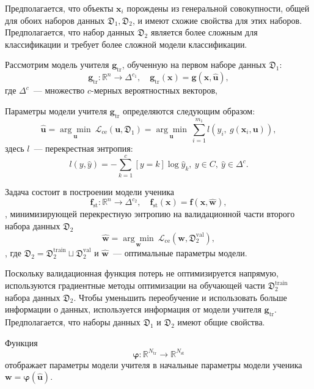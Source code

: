 Предполагается, что объекты $\mathbf{x}_i$ порождены из генеральной совокупности, общей для обоих наборов данных $\mathfrak{D}_1, \mathfrak{D}_2$, и имеют схожие свойства для этих наборов.
Предполагается, что набор данных $\mathfrak{D}_2$ является более сложным для классификации и требует более сложной модели классификации.

Рассмотрим модель учителя $\mathbf{g}_\text{tr}$, обученную на первом наборе данных $\mathfrak{D}_1$:
\[
    \mathbf{g}_\text{tr}: \mathbb{R}^{n} \rightarrow \Delta^{c_1},\quad \mathbf{g}_\text{tr}(\mathbf{x}) = \mathbf{g}(\mathbf{x}, \hat{\mathbf{u}}),
\]
где $\Delta^c$~--- множество $c$-мерных вероятностных векторов,

Параметры модели учителя $\mathbf{g}_\text{tr}$ определяются следующим образом:
$$\hat{\mathbf{u}} =  \underset{\mathbf{u}}{\arg\min}~\mathcal{L}_\text{ce}(\mathbf{u}, \mathfrak{D}_1) =\underset{\mathbf{u}}{\arg\min}~\sum\limits_{i=1}^{m_1} l \left(y_i,~g(\mathbf{x}_i, \mathbf{u})\right),$$
здесь $l$~--- перекрестная энтропия:
$$l(y, \hat{y}) = -\sum\limits_{k=1}^{c} [y = k] \log{\hat{y}_k},~y \in C,~\hat{y} \in \Delta^c.$$

Задача состоит в построении модели ученика
\[
    \mathbf{f}_\text{st}: \mathbb{R}^{n} \rightarrow \Delta^{c_2},\quad \mathbf{f}_\text{st}(\mathbf{x}) = \mathbf{f}(\mathbf{x}, \hat{\mathbf{w}}),
\],
минимизирующей перекрестную энтропию на валидационной части второго набора данных $\mathfrak{D}_2$
\[
    \hat{\mathbf{w}} =  \underset{\mathbf{w}}{\arg\min}~\mathcal{L}_\text{ce}(\mathbf{w}, \mathfrak{D}^\text{val}_2),
\],
где $\mathfrak{D}_2 = \mathfrak{D}^\text{train}_2 \sqcup \mathfrak{D}^{\text{val}}_2$ и $\hat{\mathbf{w}}$~--- оптимальные параметры модели.

Поскольку валидационная функция потерь не оптимизируется напрямую, используются градиентные методы оптимизации на обучающей части $\mathfrak{D}^\text{train}_2$ набора данных $\mathfrak{D}_2$.
Чтобы уменьшить переобучение и использовать больше информации о данных, используется информация от модели учителя $\mathbf{g}_{\text{tr}}$.
Предполагается, что наборы данных $\mathfrak{D}_1$ и $\mathfrak{D}_2$ имеют общие свойства.

Функция
\[
    \boldsymbol{\varphi}: \mathbb{R}^{N_\text{tr}} \rightarrow \mathbb{R}^{N_\text{st}}
\]
отображает параметры модели учителя в начальные параметры модели ученика $\mathbf{w} = \boldsymbol{\varphi}(\hat{\mathbf{u}})$.

